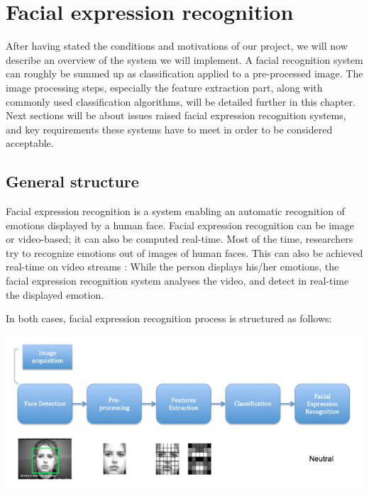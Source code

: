 \phantom{}
\chapter{Facial expression recognition}

\noindent After having stated the conditions and motivations of our project, we will now describe an overview of the system we will implement. A facial recognition system can roughly be summed up as classification applied to a pre-processed image. The image processing steps, especially the feature extraction part, along with commonly used classification algorithms, will be detailed further in this chapter. Next sections will be about issues raised facial expression recognition systems, and key requirements these systems have to meet in order to be considered acceptable.

\section{General structure}

\noindent Facial expression recognition is a system enabling an automatic recognition of emotions displayed by a human face. Facial expression recognition can be image or video-based; it can also be computed real-time. Most of the time, researchers try to recognize emotions out of images of human faces. This can also be achieved real-time on video streams : While the person displays his/her emotions, the facial expression recognition system analyses the video, and detect in real-time the displayed emotion.
\newline

\noindent In both cases, facial expression recognition process is structured as follows:
\newline

\noindent \includegraphics[scale=0.6]{figures/facial_expression_recognition_process}
\newline

